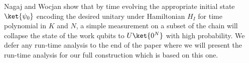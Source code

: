 \documentclass[11pt,letterpaper]{article}
\newcommand{\<}{\langle}
\renewcommand{\>}{\rangle}
\newcommand{\gat}{\,\blacktriangleleft}  %
\newcommand{\mov}{\,\vartriangleleft}    %
\newcommand{\ri}{\overrightarrow{I}}
\newcommand{\rw}{\overrightarrow{W}}
\newcommand{\rs}{\overrightarrow{S}}
\begin{document}
Nagaj and Wocjan \cite{NW} show that by time evolving the appropriate initial state $\ket{\psi_0}$ encoding the desired unitary under Hamiltonian $H_I$ for time polynomial in $K$ and $N$, a simple measurement on a subset of the chain will collapse the state of the work qubits to $U\ket{0^N}$ with high probability. We defer any run-time analysis to the end of the paper where we will present the run-time analysis for our full construction which is based on this one.



\end{document}
